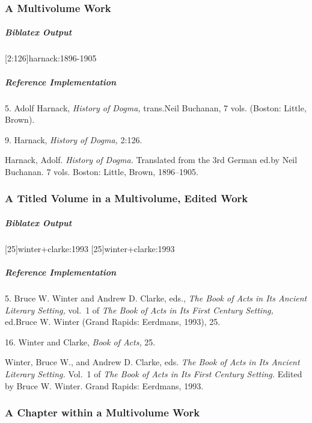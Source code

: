\documentclass[a4paper]{article}
\newenvironment{biboutput}{%
  \subparagraph{Biblatex Output}
}{\color{black}}
\newenvironment{refimp}{%
  \subparagraph{Reference Implementation}
  \color{reference-colour}
  \rm
}{\par\color{black}}
\begin{document}
\subsubsection{A Multivolume Work}

\begin{biboutput}
  [2:126]{harnack:1896-1905}
\end{biboutput}

\begin{refimp}
  \hspace*{\bibindent}5. Adolf Harnack, \emph{History of Dogma,} trans.\@ Neil
  Buchanan, 7 vols. (Boston: Little, Brown).

  \hspace*{\bibindent}9. Harnack, \emph{History of Dogma,} 2:126.

  \hangindent\bibindent Harnack, Adolf. \emph{History of Dogma.} Translated
  from the 3rd German ed.\@ by Neil Buchanan. 7 vols. Boston: Little, Brown,
  1896–1905.
\end{refimp}

\subsubsection{A Titled Volume in a Multivolume, Edited Work}

\begin{biboutput}
  [25]{winter+clarke:1993}
  [25]{winter+clarke:1993}
\end{biboutput}

\begin{refimp}
  \hspace*{\bibindent}5. Bruce W. Winter and Andrew D. Clarke, eds., \emph{The
  Book of Acts in Its Ancient Literary Setting,} vol.~1 of \emph{The Book of
  Acts in Its First Century Setting,} ed.\@ Bruce W. Winter (Grand Rapids:
  Eerdmans, 1993), 25.

  \hspace*{\bibindent}16. Winter and Clarke, \emph{Book of Acts,} 25.

  \hangindent\bibindent Winter, Bruce W., and Andrew D. Clarke, eds. \emph{The
  Book of Acts in Its Ancient Literary Setting.} Vol.~1 of \emph{The Book of
  Acts in Its First Century Setting.} Edited by Bruce W. Winter. Grand Rapids:
  Eerdmans, 1993.
\end{refimp}

\subsubsection{A Chapter within a Multivolume Work}
\end{document}
